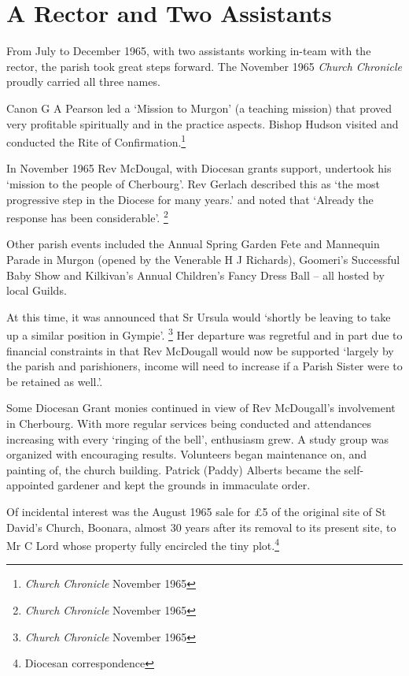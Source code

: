 \hypertarget{a-rector-and-two-assistants}{%
\section{A Rector and Two
Assistants}\label{a-rector-and-two-assistants}}

From July to December 1965, with two assistants working in-team with the
rector, the parish took great steps forward. The November 1965
\emph{Church Chronicle} proudly carried all three names.

Canon G A Pearson led a `Mission to Murgon' (a teaching mission) that
proved very profitable spiritually and in the practice aspects. Bishop
Hudson visited and conducted the Rite of Confirmation.\footnote{\emph{Church
  Chronicle} November 1965}

In November 1965 Rev McDougal, with Diocesan grants support, undertook
his `mission to the people of Cherbourg'. Rev Gerlach described this as
`the most progressive step in the Diocese for many years.' and noted
that `Already the response has been considerable'. \footnote{\emph{Church
  Chronicle} November 1965}

Other parish events included the Annual Spring Garden Fete and Mannequin
Parade in Murgon (opened by the Venerable H J Richards), Goomeri's
Successful Baby Show and Kilkivan's Annual Children's Fancy Dress Ball
-- all hosted by local Guilds.

At this time, it was announced that Sr Ursula would `shortly be leaving
to take up a similar position in Gympie'. \footnote{\emph{Church
  Chronicle} November 1965} Her departure was regretful and in part due
to financial constraints in that Rev McDougall would now be supported
`largely by the parish and parishioners, income will need to increase if
a Parish Sister were to be retained as well.'.

Some Diocesan Grant monies continued in view of Rev McDougall's
involvement in Cherbourg. With more regular services being conducted and
attendances increasing with every `ringing of the bell', enthusiasm
grew. A study group was organized with encouraging results. Volunteers
began maintenance on, and painting of, the church building. Patrick
(Paddy) Alberts became the self-appointed gardener and kept the grounds
in immaculate order.

Of incidental interest was the August 1965 sale for £5 of the original
site of St David's Church, Boonara, almost 30 years after its removal to
its present site, to Mr C Lord whose property fully encircled the tiny
plot.\footnote{Diocesan correspondence}

